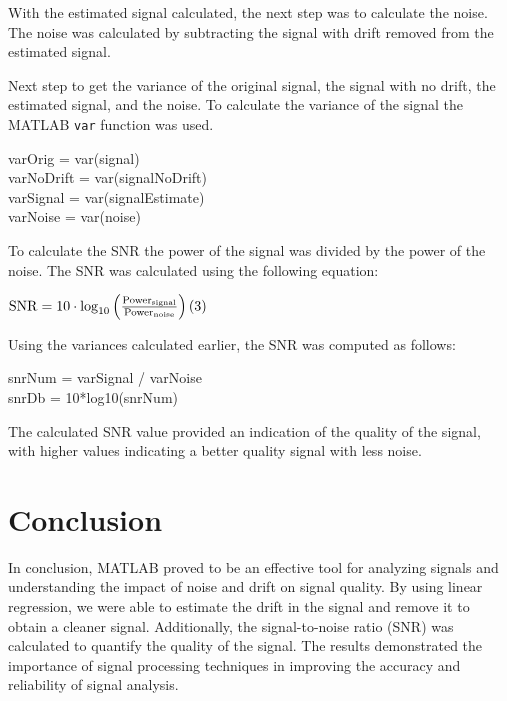 \documentclass[journal]{IEEEtran}
\begin{document}
\vspace{1em} %

With the estimated signal calculated, the next step was to calculate the noise. The noise was calculated by subtracting the signal with drift removed from the estimated signal.

Next step to get the variance of the original signal, the signal with no drift, the estimated signal, and the noise. To calculate the variance of the signal the MATLAB \texttt{var} function was used.

\vspace{1em} %
\begin{raggedright}
    \noindent 
    varOrig = var(signal) \\
    varNoDrift = var(signalNoDrift) \\
    varSignal = var(signalEstimate) \\
    varNoise = var(noise) \\
\end{raggedright}

To calculate the SNR the power of the signal was divided by the power of the noise. The SNR was calculated using the following equation:

\vspace{1em} %
\begin{raggedright}
    \noindent $\mathrm{SNR} = 10 \cdot \log_{10}\left(\frac{\mathrm{Power_{signal}}}{\mathrm{Power_{noise}}}\right) \hfill (3)$
\end{raggedright}

\vspace{1em} %
Using the variances calculated earlier, the SNR was computed as follows:

\vspace{1em} %
\begin{raggedright}
    \noindent 
    snrNum = varSignal / varNoise \\
    snrDb = 10*log10(snrNum)
\end{raggedright}

\vspace{1em} %
The calculated SNR value provided an indication of the quality of the signal, with higher values indicating a better quality signal with less noise.

\section{Conclusion}
In conclusion, MATLAB proved to be an effective tool for analyzing signals and understanding the impact of noise and drift on signal quality. By using linear regression, we were able to estimate the drift in the signal and remove it to obtain a cleaner signal. Additionally, the signal-to-noise ratio (SNR) was calculated to quantify the quality of the signal. The results demonstrated the importance of signal processing techniques in improving the accuracy and reliability of signal analysis.
\end{document}
